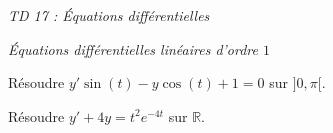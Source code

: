 \documentclass[a4paper,10pt]{report}
\begin{document}
\everymath{\displaystyle}

\begin{center}
\textit{{ {\huge TD 17 : Équations différentielles}}}
\end{center}


%


\medskip

\begin{center}
\textit{{ {\large Équations différentielles linéaires d'ordre $1$}}}
\end{center}

\medskip

\begin{Exercice}{} Résoudre $y' \sin(t)-y \cos(t)+1=0$ sur $]0,\pi[$.
\end{Exercice}


\begin{Exercice}{} Résoudre $y'+4y = t^2 e^{-4t}$ sur $\mathbb{R}$. 
\end{Exercice}

\end{document}
